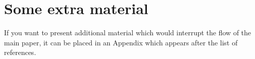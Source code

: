 \documentclass[fleqn,usenatbib]{mnras}
\begin{document}








\appendix

\section{Some extra material}

If you want to present additional material which would interrupt the flow of the main paper,
it can be placed in an Appendix which appears after the list of references.



\bsp	%
\label{lastpage}
\end{document}
